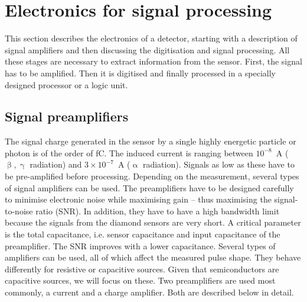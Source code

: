 \section{Electronics for signal processing} %
\label{sec:elecsigproc}
This section describes the electronics of a detector, starting with a description of signal amplifiers and then discussing the digitisation and signal processing. All these stages are necessary to extract information from the sensor. First, the signal has to be amplified. Then it is digitised and finally processed in a specially designed processor or a logic unit.

\subsection{Signal preamplifiers}
The signal charge generated in the sensor by a single highly energetic particle or photon is of the order of fC. The induced current is ranging between $10^{-8}$~A ($\upbeta, \upgamma$ radiation) and $3\times10^{-7}$~A ($\upalpha$ radiation). Signals as low as these have to be pre-amplified before processing. Depending on the measurement, several types of signal amplifiers can be used. The preamplifiers have to be designed carefully to minimise electronic noise while maximising gain -- thus maximising the signal-to-noise ratio (SNR). In addition, they have to have a high bandwidth limit because the signals from the diamond sensors are very short. A critical parameter is the total capacitance, i.e. sensor capacitance and input capacitance of the preamplifier. The SNR improves with a lower capacitance. Several types of amplifiers can be used, all of which affect the measured pulse shape. They behave differently for resistive or capacitive sources. Given that semiconductors are capacitive sources, we will focus on these. Two preamplifiers are used most commonly, a current and a charge amplifier. Both are described below in detail. 

